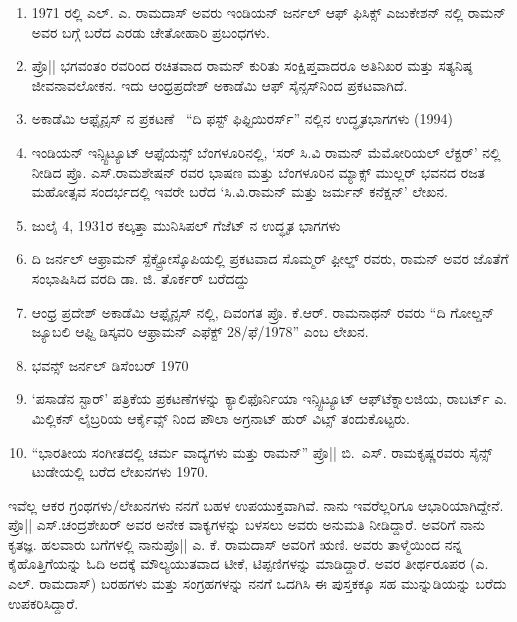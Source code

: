 \begin{enumerate}
\item 1971 ರಲ್ಲಿ ಎಲ್. ಎ. ರಾಮದಾಸ್ ಅವರು ಇಂಡಿಯನ್ ಜರ್ನಲ್ ಆಫ್‌ ಫಿಸಿಕ್ಸ್ ಎಜುಕೇಶನ್ ನಲ್ಲಿ ರಾಮನ್ ಅವರ ಬಗ್ಗೆ ಬರೆದ ಎರಡು ಚೇತೋಹಾರಿ ಪ್ರಬಂಧಗಳು.

\item ಪ್ರೊ|| ಭಗವಂತಂ ರವರಿಂದ ರಚಿತವಾದ ರಾಮನ್ ಕುರಿತು ಸಂಕ್ಷಿಪ್ತವಾದರೂ ಅತಿನಿಖರ ಮತ್ತು ಸತ್ಯನಿಷ್ಠ ಜೀವನಾವಲೋಕನ. ಇದು ಆಂಧ್ರಪ್ರದೇಶ್ ಅಕಾಡೆಮಿ ಆಫ್‌ ಸೈನ್ಸಸ್‌ನಿಂದ ಪ್ರಕಟವಾಗಿದೆ.

\item ಅಕಾಡೆಮಿ ಆಫ್ಸೈನ್ಸಸ್ ನ ಪ್ರಕಟಣೆ ~“ದಿ ಫಸ್ಟ್ ಫಿಫ್ಟಿಯಿರರ್ಸ್” ನಲ್ಲಿನ ಉದ್ಧೃತ\break ಭಾಗಗಳು (1994)

\item ಇಂಡಿಯನ್ ಇನ್ಸ್ಟಿಟ್ಯೂಟ್ ಆಫ್ಸೆಯನ್ಸ್ ಬೆಂಗಳೂರಿನಲ್ಲಿ, ‘ಸರ್ ಸಿ.ವಿ ರಾಮನ್ ಮೆಮೋರಿಯಲ್ ಲೆಕ್ಟರ್’ ನಲ್ಲಿ ನೀಡಿದ ಪ್ರೊ. ಎಸ್.ರಾಮಶೇಷನ್ ರವರ ಭಾಷಣ ಮತ್ತು ಬೆಂಗಳೂರಿನ ಮ್ಯಾಕ್ಸ್ ಮುಲ್ಲರ್ ಭವನದ ರಜತ ಮಹೋತ್ಸವ ಸಂದರ್ಭದಲ್ಲಿ ಇವರೇ ಬರೆದ ‘ಸಿ.ವಿ.ರಾಮನ್ ಮತ್ತು ಜರ್ಮನ್ ಕನೆಕ್ಷನ್’ ಲೇಖನ. 

\item ಜುಲೈ 4, 1931ರ ಕಲ್ಕತ್ತಾ ಮುನಿಸಿಪಲ್ ಗೆಜೆಟ್ ನ ಉದ್ಧೃತ ಭಾಗಗಳು

\item  ದಿ ಜರ್ನಲ್ ಆಫ್ರಾಮನ್ ಸ್ಪೆಕ್ಟ್ರೋಸ್ಕೊಪಿಯಲ್ಲಿ ಪ್ರಕಟವಾದ ಸೊಮ್ಮರ್ ಫಿ಼ೕಲ್ಡ್ ರವರು, ರಾಮನ್ ಅವರ ಜೊತೆಗೆ ಸಂಭಾಷಿಸಿದ ವರದಿ\enginline{-} ಡಾ. ಜಿ. ತೊರ್ಕರ್ ಬರೆದದ್ದು

\item ಆಂಧ್ರ ಪ್ರದೇಶ್ ಅಕಾಡೆಮಿ ಆಫ್ಸೈನ್ಸಸ್ ನಲ್ಲಿ, ದಿವಂಗತ ಪ್ರೊ. ಕೆ.ಆರ್. ರಾಮನಾಥನ್ ರವರು “ದಿ ಗೋಲ್ಡನ್ ಜ್ಯೂಬಲಿ ಆಫ್ದಿ ಡಿಸ್ಕವರಿ ಆಫ್ರಾಮನ್ ಎಫೆಕ್ಟ್ 28/ಫೆ/1978” ಎಂಬ ಲೇಖನ. 

\item ಭವನ್ಸ್ ಜರ್ನಲ್ ಡಿಸೆಂಬರ್ 1970

\item  ‘ಪಸಾಡೆನ ಸ್ಟಾರ್’ ಪತ್ರಿಕೆಯ ಪ್ರಕಟಣೆಗಳನ್ನು ಕ್ಯಾಲಿಫೊರ್ನಿಯಾ ಇನ್ಸ್ಟಿಟ್ಯೂಟ್ ಆಫ್‌\break ಟೆಕ್ನಾಲಜಿಯ, ರಾಬರ್ಟ್ ಎ. ಮಿಲ್ಲಿಕನ್ ಲೈಬ್ರರಿಯ ಆರ್ಕೈವ್ಸ್ ನಿಂದ ಪೌಲಾ ಅಗ್ರನಾಟ್ ಹುರ್ ವಿಟ್ಸ್  ತಂದುಕೊಟ್ಟರು.

\item  “ಭಾರತೀಯ ಸಂಗೀತದಲ್ಲಿ ಚರ್ಮ ವಾದ್ಯಗಳು ಮತ್ತು ರಾಮನ್” \enginline{--}ಪ್ರೊ|| ಬಿ.~ಎಸ್. ರಾಮಕೃಷ್ಣರವರು ಸೈನ್ಸ್ ಟುಡೇಯಲ್ಲಿ ಬರೆದ ಲೇಖನಗಳು 1970.
\end{enumerate}

ಇವೆಲ್ಲ ಆಕರ ಗ್ರಂಥಗಳು/ಲೇಖನಗಳು ನನಗೆ ಬಹಳ ಉಪಯುಕ್ತವಾಗಿವೆ. ನಾನು ಇವರೆಲ್ಲರಿಗೂ ಆಭಾರಿಯಾಗಿದ್ದೇನೆ. ಪ್ರೊ|| ಎಸ್.ಚಂದ್ರಶೇಖರ್ ಅವರ ಅನೇಕ ವಾಕ್ಯಗಳನ್ನು ಬಳಸಲು ಅವರು ಅನುಮತಿ ನೀಡಿದ್ದಾರೆ. ಅವರಿಗೆ ನಾನು ಕೃತಜ್ಞ. ಹಲವಾರು ಬಗೆಗಳಲ್ಲಿ ನಾನು\break ಪ್ರೊ|| ಎ. ಕೆ. ರಾಮದಾಸ್ ಅವರಿಗೆ ಋಣಿ. ಅವರು ತಾಳ್ಮೆಯಿಂದ ನನ್ನ ಕೈಹೊತ್ತಿಗೆಯನ್ನು ಓದಿ ಅದಕ್ಕೆ ಮೌಲ್ಯಯುತವಾದ ಟೀಕೆ, ಟಿಪ್ಪಣಿಗಳನ್ನು ಮಾಡಿದ್ದಾರೆ. ಅವರ ತೀರ್ಥರೂಪರ (ಎ. ಎಲ್. ರಾಮದಾಸ್) ಬರಹಗಳು ಮತ್ತು ಸಂಗ್ರಹಗಳನ್ನು ನನಗೆ ಒದಗಿಸಿ ಈ ಪುಸ್ತಕಕ್ಕೂ ಸಹ ಮುನ್ನುಡಿ\break ಯನ್ನು ಬರೆದು ಉಪಕರಿಸಿದ್ದಾರೆ.

